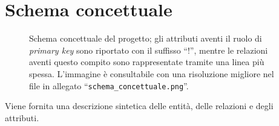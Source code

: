 \documentclass{article}
\begin{document}
\section{Schema concettuale}
\begin{figure}[H]
    \caption{Schema concettuale del progetto; gli attributi aventi il ruolo di \emph{primary key} sono riportato con il suffisso ``!'', mentre le relazioni aventi questo compito sono rappresentate tramite una linea più spessa. L'immagine è consultabile con una risoluzione migliore nel file in allegato ``\texttt{schema\_concettuale.png}''.}
\end{figure}
Viene fornita una descrizione sintetica delle entità, delle relazioni e degli attributi.
\end{document}
